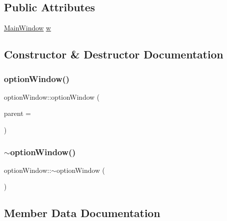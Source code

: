 \subsection*{Public Attributes}
\begin{DoxyCompactItemize}
\item 
\hyperlink{classMainWindow}{Main\+Window} \hyperlink{classoptionWindow_a3f43dd31b7b6836835ae91bff4f22e2a}{w}
\end{DoxyCompactItemize}


\subsection{Constructor \& Destructor Documentation}
\mbox{\label{classoptionWindow_a520eacaa5cabadee57621a9a24345302}} 
\subsubsection{\texorpdfstring{option\+Window()}{optionWindow()}}
{\footnotesize\ttfamily option\+Window\+::option\+Window (\begin{DoxyParamCaption}\item[{Q\+Widget $\ast$}]{parent = {} }\end{DoxyParamCaption})\hspace{0.3cm}{\ttfamily [explicit]}}

\mbox{\label{classoptionWindow_a767beb27d15754996076ff312ae2877f}} 
\subsubsection{\texorpdfstring{$\sim$option\+Window()}{~optionWindow()}}
{\footnotesize\ttfamily option\+Window\+::$\sim$option\+Window (\begin{DoxyParamCaption}{ }\end{DoxyParamCaption})}



\subsection{Member Data Documentation}
\mbox{\label{classoptionWindow_a3f43dd31b7b6836835ae91bff4f22e2a}} 
